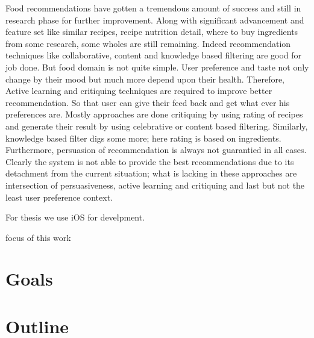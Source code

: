 Food recommendations have gotten a tremendous amount of success and still in research phase for further improvement. Along with significant advancement and feature set like similar recipes, recipe nutrition detail, where to buy ingredients from some research, some wholes are still remaining. Indeed recommendation techniques like collaborative, content and knowledge based filtering are good for job done. But food domain is not quite simple. User preference and taste not only change by their mood but much more depend upon their health. Therefore, Active learning and critiquing techniques are required to improve better recommendation. So that user can give their feed back and get what ever his preferences are. Mostly approaches are done critiquing by using rating of recipes and generate their result by using celebrative or content based filtering. Similarly, knowledge based filter digs some more; here rating is based on ingredients. Furthermore, persuasion of recommendation is always not guarantied in all cases. Clearly the system is not able to provide the best recommendations due to its detachment from the current situation; what is lacking in these approaches are intersection of persuasiveness, active learning and critiquing and last but not the least user preference context.\newline




For thesis we use iOS for develpment.

focus of  this work

\section{Goals}

\section{Outline}
